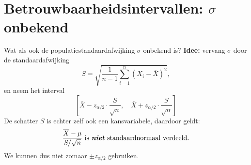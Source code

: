 
\section{Betrouwbaarheidsintervallen: $\sigma$ onbekend}

    \begin{frame}{Wat als ook de populatiestandaardafwijking $\sigma$ onbekend is?}
        \textbf{Idee:} vervang $\sigma$ door de standaardafwijking
        \[
            S = \sqrt{\frac{1}{n-1}\sum_{i=1}^{n} \left(X_i - \overline{X}\right)^2},
        \]
        en neem het interval
        \[
            \left[\overline{X} - z_{\alpha/2} \cdot \frac{S}{\sqrt{n}}, \quad \overline{X} + z_{\alpha/2} \cdot \frac{S}{\sqrt{n}}\right]
        \]
        \vfill\pause
        De schatter $S$ is echter zelf ook een kansvariabele, daardoor geldt:
        \[
            \frac{\overline{X} - \mu}{S / \sqrt{n}} \text{ is \emph{\textbf{niet}} standaardnormaal verdeeld.}
        \]
        We kunnen dus niet zomaar $\pm z_{\alpha/2}$ gebruiken.
    \end{frame}

